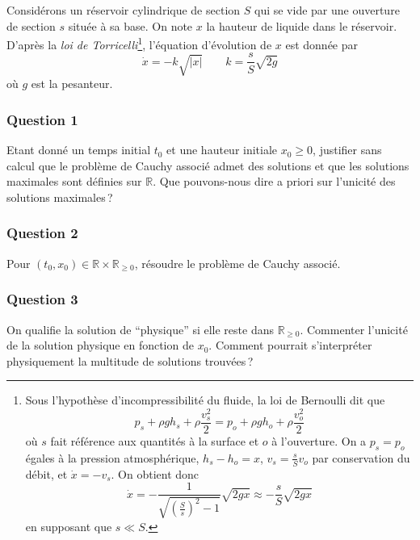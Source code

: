 Considérons un réservoir cylindrique de section \(S\) qui se vide par
une ouverture de section \(s\) située à sa base. On note \(x\) la
hauteur de liquide dans le réservoir. D'après la \emph{loi de
Torricelli}\footnote{Sous l'hypothèse d'incompressibilité du fluide, la
  loi de Bernoulli dit que \[
  p_s + \rho g h_s + \rho \frac{v_s^2}{2}=p_o + \rho g h_o + \rho \frac{v_o^2}{2}
  \] où \(s\) fait référence aux quantités à la surface et \(o\) à
  l'ouverture. On a \(p_s=p_o\) égales à la pression atmosphérique,
  \(h_s-h_o=x\), \(v_s=\frac{s}{S}v_o\) par conservation du débit, et
  \(\dot{x} = - v_s\). On obtient donc \[
  \dot{x} = - \frac{1}{\sqrt{\left(\frac{S}{s}\right)^2-1}} \sqrt{2gx} \approx -\frac{s}{S} \sqrt{2gx}
  \] en supposant que \(s\ll S\).}, l'équation d'évolution de \(x\) est
donnée par \[
\dot{x}=-k\sqrt{|x|} \qquad k = \frac{s}{S}\sqrt{2g}
\] où \(g\) est la pesanteur.

\hypertarget{tor-1}{%
\subsubsection*{Question 1}\label{tor-1}}


Etant donné un temps initial \(t_0\) et une hauteur initiale
\(x_0\geq 0\), justifier sans calcul que le problème de Cauchy associé
admet des solutions et que les solutions maximales sont définies sur
\(\mathbb{R}\). Que pouvons-nous dire a priori sur l'unicité des
solutions maximales\,?

\hypertarget{tor-2}{%
\subsubsection*{Question 2}\label{tor-2}}


Pour \((t_0,x_0)\in \mathbb{R}\times \mathbb{R}_{\geq0}\), résoudre le
problème de Cauchy associé.

\hypertarget{tor-3}{%
\subsubsection*{Question 3}\label{tor-3}}


On qualifie la solution de ``physique'' si elle reste dans
\(\mathbb{R}_{\geq0}\). Commenter l'unicité de la solution physique en
fonction de \(x_0\). Comment pourrait s'interpréter physiquement la
multitude de solutions trouvées\,?

